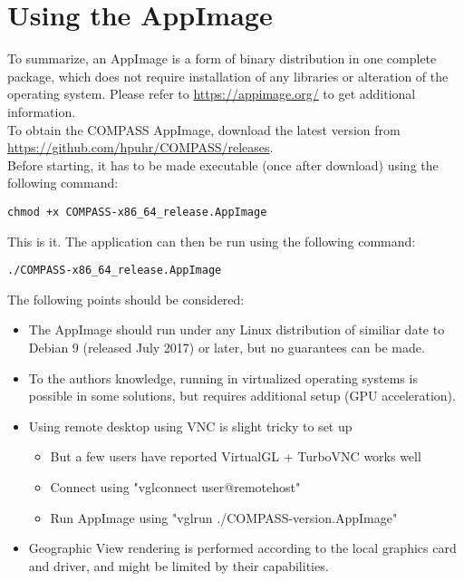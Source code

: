 \section{Using the AppImage}

To summarize, an AppImage is a form of binary distribution in one complete package, which does not require installation of any libraries or alteration of the operating system. 
Please refer to \url{https://appimage.org/} to get additional information. \\

To obtain the COMPASS AppImage, download the latest version from \url{https://github.com/hpuhr/COMPASS/releases}. \\

Before starting, it has to be made executable (once after download) using the following command:
\begin{lstlisting}
chmod +x COMPASS-x86_64_release.AppImage
\end{lstlisting}

This is it. The application can then be run using the following command:
\begin{lstlisting}
./COMPASS-x86_64_release.AppImage
\end{lstlisting}

The following points should be considered:

\begin{itemize}  
\item The AppImage should run under any Linux distribution of similiar date to Debian 9 (released July 2017) or later, but no guarantees can be made.
\item To the authors knowledge, running in virtualized operating systems is possible in some solutions, but requires additional setup (GPU acceleration).
\item Using remote desktop using VNC is slight tricky to set up
\begin{itemize}  
\item But a few users have reported VirtualGL + TurboVNC works well
\item Connect using "vglconnect user@remotehost"
\item Run AppImage using "vglrun ./COMPASS-version.AppImage"
\end{itemize} 
\item Geographic View rendering is performed according to the local graphics card and driver, and might be limited by their capabilities.
\end{itemize} 
